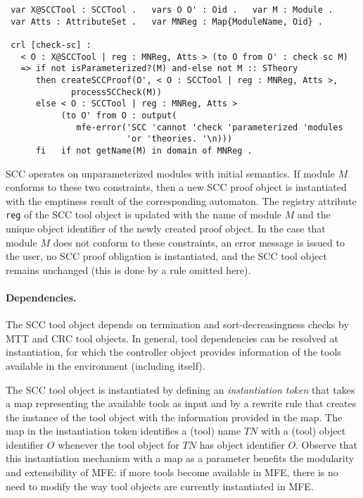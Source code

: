 \begin{small}
\begin{verbatim}
 var X@SCCTool : SCCTool .   vars O O' : Oid .   var M : Module .
 var Atts : AttributeSet .   var MNReg : Map{ModuleName, Oid} .

 crl [check-sc] :
   < O : X@SCCTool | reg : MNReg, Atts > (to O from O' : check sc M)
   => if not isParameterized?(M) and-else not M :: STheory
      then createSCCProof(O', < O : SCCTool | reg : MNReg, Atts >, 
             processSCCheck(M))
      else < O : SCCTool | reg : MNReg, Atts > 
           (to O' from O : output(
              mfe-error('SCC 'cannot 'check 'parameterized 'modules 
                        'or 'theories. '\n)))
      fi   if not getName(M) in domain of MNReg .
\end{verbatim}
\end{small}
%
SCC operates on unparameterized modules 
with initial semantics.
If module $M$ conforms to these two constraints,
then a new SCC proof object is instantiated with the
emptiness result of the corresponding automaton. 
The registry attribute {\tt reg} of the SCC tool object
is updated with the name of module $M$ and the unique object 
identifier of the newly created proof object.
In the case that module $M$ does not conform to these
constraints,
an error message is issued to the user, no SCC proof
obligation is instantiated, and the SCC tool object
remains unchanged (this is done by a rule omitted here). 

\paragraph{\bf Dependencies.} 
The SCC tool object depends on termination and sort-decreasingness
checks by MTT and CRC tool objects. In general, tool dependencies can be resolved at instantiation,
for which the controller object provides information of the tools available in the
environment (including itself).

The SCC tool object
is instantiated by defining an {\em instantiation token} that takes
a map representing the available tools as input
and by a rewrite rule that creates the instance of the tool object
with the information provided in the map.
The map in the instantiation token
identifies a (tool) name $\textit{TN}$ with a (tool) object identifier
$O$ whenever the tool object for $\textit{TN}$ has object identifier $O$.
Observe that this instantiation mechanism with
a map as a parameter benefits the modularity and extensibility
of MFE: if more tools become available in MFE, there is no need 
to modify the way tool objects are currently instantiated in MFE. 

